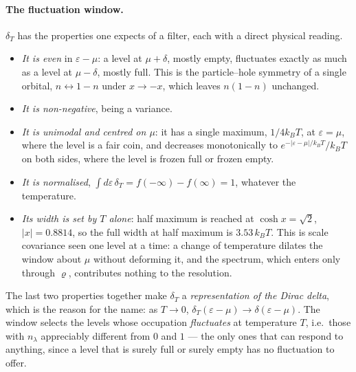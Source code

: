 \documentclass[10pt,a4paper]{article}
\theoremstyle{plain}
\theoremstyle{remark}
\begin{document}
\paragraph{The fluctuation window.} $ \delta_T $ has the properties one expects
of a filter, each with a direct physical reading.
\begin{itemize}
\item \emph{It is even} in $ \varepsilon - \mu $: a level at $ \mu + \delta $,
  mostly empty, fluctuates exactly as much as a level at $ \mu - \delta $, mostly
  full. This is the particle--hole symmetry of a single orbital,
  $ n \leftrightarrow 1 - n $ under $ x \to -x $, which leaves $ n(1-n) $ unchanged.
\item \emph{It is non-negative}, being a variance.
\item \emph{It is unimodal and centred on $ \mu $}: it has a single maximum,
  $ 1/4k_BT $, at $ \varepsilon = \mu $, where the level is a fair coin, and
  decreases monotonically to $ e^{-|\varepsilon-\mu|/k_BT}/k_BT $ on both sides,
  where the level is frozen full or frozen empty.
\item \emph{It is normalised}, $ \int d\varepsilon\,\delta_T = f(-\infty) - f(\infty)
  = 1 $, whatever the temperature.
\item \emph{Its width is set by $ T $ alone}: half maximum is reached at
  $ \cosh x = \sqrt2 $, $ |x| = 0.8814 $, so the full width at half maximum is
  $ 3.53\,k_BT $. This is scale covariance seen one level at a time: a change of
  temperature dilates the window about $ \mu $ without deforming it, and the
  spectrum, which enters only through $ \varrho $, contributes nothing to the
  resolution.
\end{itemize}
The last two properties together make $ \delta_T $ a \emph{representation of the
Dirac delta}, which is the reason for the name: as $ T \to 0 $,
$ \delta_T(\varepsilon - \mu) \to \delta(\varepsilon - \mu) $.
The window selects the levels whose occupation \emph{fluctuates} at temperature
$ T $, i.e.\ those with $ n_\lambda $ appreciably different from $ 0 $ and $ 1 $ --- the
only ones that can respond to anything, since a level that is surely full or surely
empty has no fluctuation to offer.
\end{document}
